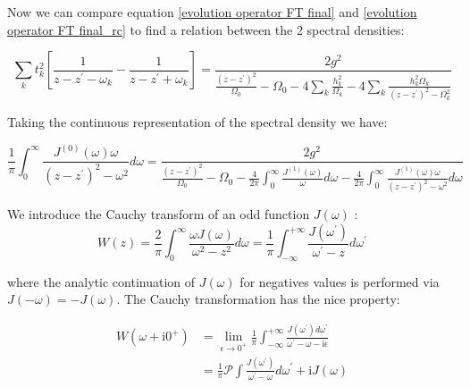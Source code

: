 \documentclass[%
preprint,
onecolumn,
notitlepag,
 amsmath,amssymb,
 aps,
 pra,
]{revtex4-2}
\begin{document}
Now we can compare equation \eqref{evolution operator FT final} and  \eqref{evolution operator FT final_rc}  to find a relation between the 2 spectral densities: 

\begin{equation}
\sum_{k} t_{k}^{2}\left[\frac{1}{z-z^{\prime}-\omega_{k}}-\frac{1}{z-z^{\prime}+\omega_{k}}\right]=\frac{2 g^{2}}{\frac{\left(z-z^{\prime}\right)^{2}}{\Omega_{0}}-\Omega_{0}-4 \sum_{k} \frac{h_{k}^{2}}{\Omega_{k}}-4 \sum_{k} \frac{h_{k}^{2} \Omega_{k}}{\left(z-z^{\prime}\right)^{2}-\Omega_{k}^{2}}}
\end{equation}



Taking the continuous representation of the spectral density we have:

\begin{equation}
\frac{1}{\pi} \int_{0}^{\infty} \frac{J^{(0)}(\omega) \omega}{\left(z-z^{\prime}\right)^{2}-\omega^{2}} d \omega=\frac{2 g^{2}}{\frac{\left(z-z^{\prime}\right)^{2}}{\Omega_{0}}-\Omega_{0}-\frac{4}{2 \pi} \int_{0}^{\infty} \frac{J^{(1)}(\omega)}{\omega} d \omega-\frac{4}{2 \pi} \int_{0}^{\infty} \frac{J^{(1)}(\omega) \omega}{\left(z-z^{\prime}\right)^{2}-\omega^{2}} d \omega}
\label{relation SD}
\end{equation}

We introduce the Cauchy transform of an odd function $J(\omega)$ :
\begin{equation}
    W(z)=\frac{2}{\pi} \int_{0}^{\infty} \frac{\omega J(\omega)}{\omega^{2}-z^{2}} d \omega=\frac{1}{\pi} \int_{-\infty}^{+\infty} \frac{J\left(\omega^{\prime}\right)}{\omega^{\prime}-z} d \omega^{\prime}
\end{equation}


where the analytic continuation of $J(\omega)$ for negatives values is performed via $J(-\omega)=-J(\omega)$.  The Cauchy transformation has the nice property: 

\begin{equation}
\begin{aligned}
W\left(\omega+\mathrm{i} 0^{+}\right) &=\lim _{\epsilon \rightarrow 0^{+}} \frac{1}{\pi} \int_{-\infty}^{+\infty} \frac{J\left(\omega^{\prime}\right) d \omega^{\prime}}{\omega^{\prime}-\omega-\mathrm{i} \epsilon}\\
&=\frac{1}{\pi} \mathcal{P} \int \frac{J\left(\omega^{\prime}\right)}{\omega^{\prime}-\omega} d \omega^{\prime}+\mathrm{i} J(\omega)
\end{aligned}
\end{equation}
\end{document}
